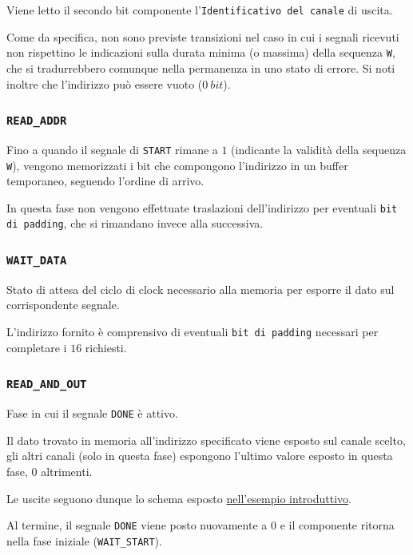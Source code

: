 \documentclass[a4paper,11pt]{article} %
\begin{document}
    Viene letto il secondo bit componente l'\texttt{Identificativo del canale} di uscita.

    Come da specifica, non sono previste transizioni nel caso in cui i segnali ricevuti non rispettino le indicazioni sulla durata minima (o massima) della sequenza \texttt{W},
    che si tradurrebbero comunque nella permanenza in uno stato di errore.
    Si noti inoltre che l'indirizzo può essere vuoto ($0\ bit$).

    \subsubsection{\texttt{READ\_ADDR}}

    Fino a quando il segnale di \texttt{START} rimane a $1$ (indicante la validità della sequenza \texttt{W}), vengono memorizzati i bit che compongono l'indirizzo in un buffer
    temporaneo, seguendo l'ordine di arrivo.

    In questa fase non vengono effettuate traslazioni dell'indirizzo per eventuali \texttt{bit di padding}, che si rimandano invece alla successiva.

    \subsubsection{\texttt{WAIT\_DATA}}

    Stato di attesa del ciclo di clock necessario alla memoria per esporre il dato sul corrispondente segnale.

    L'indirizzo fornito è comprensivo di eventuali \texttt{bit di padding} necessari per completare i $16$ richiesti.

    \subsubsection{\texttt{READ\_AND\_OUT}}

    Fase in cui il segnale \texttt{DONE} è attivo.

    Il dato trovato in memoria all'indirizzo specificato viene esposto sul canale scelto, gli altri canali (solo in questa fase) espongono l'ultimo valore esposto in questa
    fase, 0 altrimenti.

    Le uscite seguono dunque lo schema esposto \hyperref[subsec:un-primo-esempio]{nell'esempio introduttivo}.

    Al termine, il segnale \texttt{DONE} viene posto nuovamente a $0$ e il componente ritorna nella fase iniziale (\texttt{WAIT\_START}).
\end{document}
